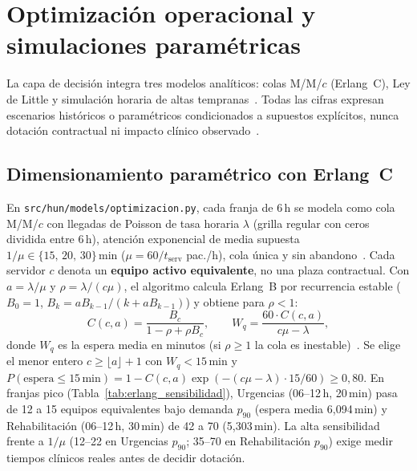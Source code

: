 
\section{Optimización operacional y simulaciones paramétricas}

La capa de decisión integra tres modelos analíticos: colas M/M/$c$ (Erlang~C), Ley de Little y simulación horaria de altas tempranas~\cite{mediflow2026optimizacion,mediflow2026informe}. Todas las cifras expresan escenarios históricos o paramétricos condicionados a supuestos explícitos, nunca dotación contractual ni impacto clínico observado~\cite{green2006queueing}.

\subsection{Dimensionamiento paramétrico con Erlang~C}

En \texttt{src/hun/models/optimizacion.py}, cada franja de 6\,h se modela como cola M/M/$c$ con llegadas de Poisson de tasa horaria $\lambda$ (grilla regular con ceros dividida entre 6\,h), atención exponencial de media supuesta $1/\mu \in \{15,\,20,\,30\}\,\text{min}$ ($\mu = 60/t_{\text{serv}}$ pac./h), cola única y sin abandono~\cite{green2006queueing,mediflow2026optimizacion}. Cada servidor $c$ denota un \textbf{equipo activo equivalente}, no una plaza contractual. Con $a = \lambda/\mu$ y $\rho = \lambda/(c\mu)$, el algoritmo calcula Erlang~B por recurrencia estable ($B_0=1$, $B_k = a B_{k-1}/(k + a B_{k-1})$) y obtiene para $\rho < 1$:
\begin{equation}
\label{eq:erlang_c}
C(c, a) = \frac{B_c}{1 - \rho + \rho B_c}, \qquad
W_q = \frac{60 \cdot C(c, a)}{c\mu - \lambda},
\end{equation}
donde $W_q$ es la espera media en minutos (si $\rho \ge 1$ la cola es inestable)~\cite{mediflow2026optimizacion}. Se elige el menor entero $c \ge \lfloor a \rfloor + 1$ con $W_q < 15\,\text{min}$ y $P(\text{espera} \le 15\,\text{min}) = 1 - C(c,a)\exp(-(c\mu - \lambda)\cdot 15/60) \ge 0{,}80$. En franjas pico (Tabla~\ref{tab:erlang_sensibilidad}), Urgencias (06--12\,h, 20\,min) pasa de 12 a 15 equipos equivalentes bajo demanda $p_{90}$ (espera media 6,094\,min) y Rehabilitación (06--12\,h, 30\,min) de 42 a 70 (5,303\,min). La alta sensibilidad frente a $1/\mu$ (12--22 en Urgencias $p_{90}$; 35--70 en Rehabilitación $p_{90}$) exige medir tiempos clínicos reales antes de decidir dotación.

